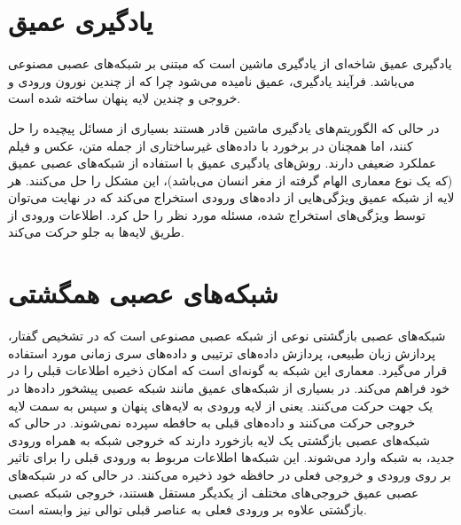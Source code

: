 \section{یادگیری عمیق}
یادگیری عمیق
شاخە‌ای از یادگیری ماشین است که مبتنی بر شبکە‌های عصبی مصنوعی
می‌باشد. فرآیند یادگیری، عمیق نامیده می‌شود چرا که از چندین نورون ورودی و خروجی و چندین لایه پنهان ساخته شده است.

در حالی که الگوریتم‌های یادگیری ماشین قادر هستند بسیاری از مسائل پیچیده را حل کنند، اما همچنان در برخورد با دادە‌های غیرساختاری از جمله متن، عکس و فیلم عملکرد ضعیفی دارند. روش‌های یادگیری عمیق با استفاده از شبکه‌های عصبی عمیق (که یک نوع معماری الهام گرفته از مغر انسان می‌باشد)، این مشکل را حل می‌کنند. هر لایه از شبکه عمیق ویژگی‌هایی از دادە‌های ورودی استخراج می‌کند که در نهایت می‌توان توسط ویژگی‌های استخراج شده، مسئله مورد نظر را حل کرد. اطلاعات ورودی از طریق لایە‌ها به
جلو حرکت می‌کند. 

\section{شبکه‌های عصبی همگشتی}
شبکه‌های عصبی بازگشتی
نوعی از شبکه عصبی مصنوعی است که در تشخیص گفتار، پردازش زبان طبیعی، پردازش دادە‌های ترتیبی
و داده‌های سری زمانی
مورد استفاده قرار می‌گیرد. معماری این شبکه به گونە‌ای است که امکان ذخیره اطلاعات قبلی را در خود فراهم می‌کند. در بسیاری از شبکە‌های عمیق مانند شبکه عصبی پیشخور
دادە‌ها در یک جهت حرکت می‌کنند. یعنی از لایه ورودی به لایە‌های پنهان و سپس به سمت لایە خروجی حرکت می‌کنند و دادە‌های قبلی به حافطه سپرده نمی‌شوند. در حالی که شبکە‌های عصبی بازگشتی یک لایه بازخورد دارند که خروجی شبکه به همراه ورودی جدید، به شبکه وارد می‌شوند. این شبکه‌ها اطلاعات مربوط به ورودی قبلی را برای تاثیر بر روی ورودی و خروجی فعلی در حافظه خود ذخیره می‌کنند. در حالی که در شبکە‌های عصبی عمیق خروجی‌های مختلف از یکدیگر مستقل هستند، خروجی شبکه عصبی بازگشتی علاوه بر ورودی فعلی به عناصر قبلی توالی نیز وابسته است.


